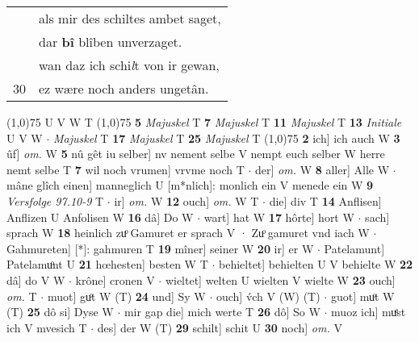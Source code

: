 \documentclass[8pt,a4paper,notitlepage]{article}
\begin{document}
\begin{table}[ht]
\begin{minipage}[t]{0.5\linewidth}
\begin{tabular}{rl}
 & als mir des schiltes ambet saget,\\ 
 & dar \textbf{bî} blîben unverzaget.\\ 
 & wan daz ich schi\textit{l}t von ir gewan,\\ 
30 & ez wære noch anders ungetân.\\ 
\end{tabular}
\scriptsize
\line(1,0){75} \newline
U V W T \newline
\line(1,0){75} \newline
\textbf{5} \textit{Majuskel} T  \textbf{7} \textit{Majuskel} T  \textbf{11} \textit{Majuskel} T  \textbf{13} \textit{Initiale} U V W   $\cdot$ \textit{Majuskel} T  \textbf{17} \textit{Majuskel} T  \textbf{25} \textit{Majuskel} T  \newline
\line(1,0){75} \newline
\textbf{2} ich] ich auch W \textbf{3} ûf] \textit{om.} W \textbf{5} nû gêt iu selber] nv nement selbe V nempt euch selber W herre nemt selbe T \textbf{7} wil noch vrumen] vrvme noch T  $\cdot$ der] \textit{om.} W \textbf{8} aller] Alle W  $\cdot$ mâne glîch einen] manneglich U [m*nlich]: monlich ein V menede ein W \textbf{9} \textit{Versfolge 97.10-9} T   $\cdot$ ir] \textit{om.} W \textbf{12} ouch] \textit{om.} W T  $\cdot$ die] div T \textbf{14} Anflisen] Anflizen U Anfolisen W \textbf{16} dâ] Do W  $\cdot$ wart] hat W \textbf{17} hôrte] hort W  $\cdot$ sach] sprach W \textbf{18} heinlich zuͦ Gamuret er sprach V · Zuͦ gamuret vnd iach W  $\cdot$ Gahmureten] [*]: gahmuren T \textbf{19} mîner] seiner W \textbf{20} ir] er W  $\cdot$ Patelamunt] Patelamuͦnt U \textbf{21} hœhesten] besten W T  $\cdot$ behieltet] behielten U V behielte W \textbf{22} dâ] do V W  $\cdot$ krône] cronen V  $\cdot$ wieltet] welten U wielten V wielte W \textbf{23} ouch] \textit{om.} T  $\cdot$ muot] guͦt W (T) \textbf{24} und] Sy W  $\cdot$ ouch] v́ch V (W) (T)  $\cdot$ guot] muͦt W (T) \textbf{25} dô si] Dyse W  $\cdot$ mir gap die] mich werte T \textbf{26} dô] So W  $\cdot$ muoz ich] muͤst ich V mvesich T  $\cdot$ des] der W (T) \textbf{29} schilt] schit U \textbf{30} noch] \textit{om.} V \newline
\end{minipage}
\end{table}
\end{document}
